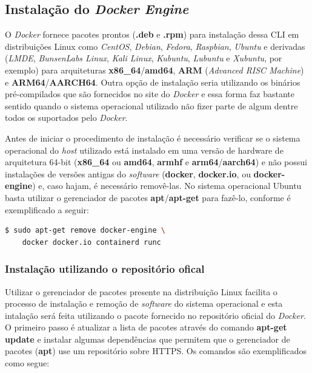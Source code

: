 \documentclass[
  12pt,				%
  openright,			%
  twoside,			%
  a4paper,			%
  english,			%
  french,				%
  spanish,			%
  brazil,				%
  ]{abntex2}
\begin{document}
\subsection*{Instalação do \textit{Docker Engine}}

O \textit{Docker} fornece pacotes prontos (\textbf{.deb} e \textbf{.rpm}) para instalação dessa CLI em distribuições Linux como \textit{CentOS}, \textit{Debian},
\textit{Fedora}, \textit{Raspbian}, \textit{Ubuntu} e derivadas (\textit{LMDE}, \textit{BunsenLabs Linux}, \textit{Kali Linux}, \textit{Kubuntu}, \textit{Lubuntu}
e \textit{Xubuntu}, por exemplo) para arquiteturas \textbf{x86\_64}/\textbf{amd64}, \textbf{ARM} (\textit{Advanced RISC Machine}) e \textbf{ARM64}/\textbf{AARCH64}.
Outra opção de instalação seria utilizando os binários pré-compilados que são fornecidos no site do \textit{Docker} e essa forma
faz bastante sentido quando o sistema operacional utilizado não fizer parte de algum dentre todos os suportados
pelo \textit{Docker}.

Antes de iniciar o procedimento de instalação é necessário verificar se o sistema operacional do \textit{host} utilizado está instalado em uma versão de hardware
de arquitetura 64-bit (\textbf{x86\_64} ou \textbf{amd64}, \textbf{armhf} e \textbf{arm64}/\textbf{aarch64}) e não possui instalações de versões antigas
do \textit{software} (\textbf{docker}, \textbf{docker.io}, ou \textbf{docker-engine}) e, caso hajam, é necessário removê-las. No sistema
operacional Ubuntu basta utilizar o gerenciador de pacotes \textbf{apt}/\textbf{apt-get} para fazê-lo, conforme é exemplificado a seguir:

\begin{adjustbox}{max width=\linewidth}
  \begin{lstlisting}[language=bash]
  $ sudo apt-get remove docker-engine \
    docker docker.io containerd runc
  \end{lstlisting}
\end{adjustbox}

\subsubsection*{Instalação utilizando o repositório ofical}

Utilizar o gerenciador de pacotes presente na distribuição Linux facilita o processo de instalação e remoção de \textit{software} do sistema operacional e esta intalação será feita
utilizando o pacote fornecido no repositório oficial do \textit{Docker}. O primeiro
passo é atualizar a lista de pacotes através do comando \textbf{apt-get update} e instalar algumas dependências que permitem que o gerenciador de pacotes (\textbf{apt}) use um repositório sobre HTTPS.
Os comandos são exemplificados como segue:
\end{document}
